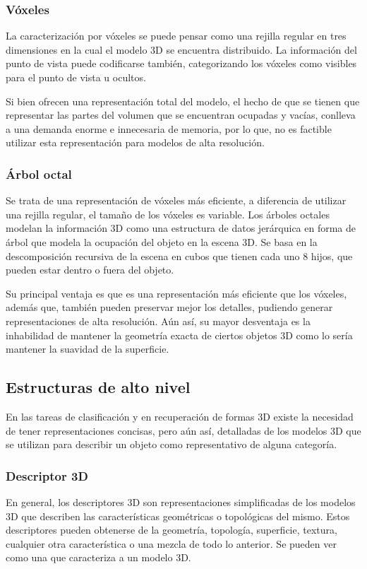 \subsubsection{Vóxeles}
La caracterización por vóxeles se puede pensar como una rejilla regular en tres dimensiones en la cual el modelo 3D se encuentra distribuido. La información del punto de vista puede codificarse también, categorizando los vóxeles como visibles para el punto de vista u ocultos.

Si bien ofrecen una representación total del modelo, el hecho de que se tienen que representar las partes del volumen que se encuentran ocupadas y vacías, conlleva a una demanda enorme e innecesaria de memoria, por lo que, no es factible utilizar esta representación para modelos de alta resolución.

\subsubsection{Árbol octal}
Se trata de una representación de vóxeles más eficiente, a diferencia de utilizar una rejilla regular, el tamaño de los vóxeles es variable. Los árboles octales modelan la información 3D como una estructura de datos jerárquica en forma de árbol que modela la ocupación del objeto en la escena 3D. Se basa en la descomposición recursiva de la escena en cubos que tienen cada uno 8 hijos, que pueden estar dentro o fuera del objeto.

Su principal ventaja es que es una representación más eficiente que los vóxeles, además que, también pueden preservar mejor los detalles, pudiendo generar representaciones de alta resolución. Aún así, su mayor desventaja es la inhabilidad de mantener la geometría exacta de ciertos objetos 3D como lo sería mantener la suavidad de la superficie.

\subsection{Estructuras de alto nivel}
En las tareas de clasificación y en recuperación de formas 3D existe la necesidad de tener representaciones concisas, pero aún así, detalladas de los modelos 3D que se utilizan para describir un objeto como representativo de alguna categoría.

\subsubsection{Descriptor 3D}
En general, los descriptores 3D son representaciones simplificadas de los modelos 3D que describen las características geométricas o topológicas del mismo. Estos descriptores pueden obtenerse de la geometría, topología, superficie, textura, cualquier otra característica o una mezcla de todo lo anterior. Se pueden ver como una  que caracteriza a un modelo 3D.

